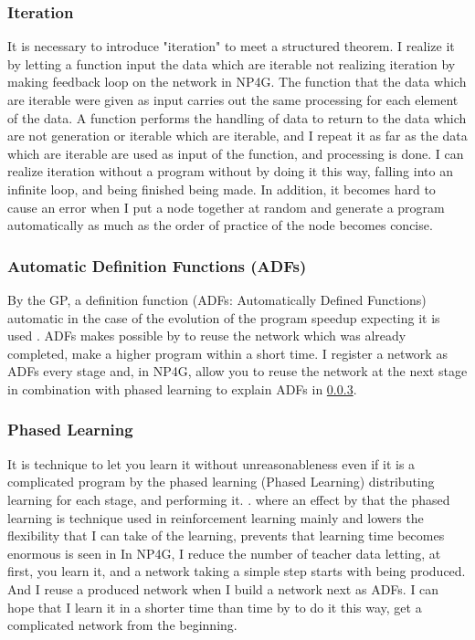 \documentclass{article}
\begin{document}
\subsubsection {Iteration}
It is necessary to introduce "iteration" to meet a structured theorem.
I realize it by letting a function input the data which are iterable not realizing iteration by making feedback loop on the network in NP4G.
The function that the data which are iterable were given as input carries out the same processing for each element of the data.
A function performs the handling of data to return to the data which are not generation or iterable which are iterable, and I repeat it as far as the data which are iterable are used as input of the function, and processing is done.
I can realize iteration without a program without by doing it this way, falling into an infinite loop, and being finished being made.
In addition, it becomes hard to cause an error when I put a node together at random and generate a program automatically as much as the order of practice of the node becomes concise.
\subsubsection {Automatic Definition Functions (ADFs)}
By the GP, a definition function (ADFs: Automatically Defined Functions) automatic in the case of the evolution of the program speedup expecting it is used \cite{adfs}.
ADFs makes possible by to reuse the network which was already completed, make a higher program within a short time.
I register a network as ADFs every stage and, in NP4G, allow you to reuse the network at the next stage in combination with phased learning to explain ADFs in \ref{sec:PL}.
\subsubsection {Phased Learning}
\label{sec:PL}
It is technique to let you learn it without unreasonableness even if it is a complicated program by the phased learning (Phased Learning) distributing learning for each stage, and performing it.
\cite{hodohara2012reinforcement}. where an effect by that the phased learning is technique used in reinforcement learning mainly and lowers the flexibility that I can take of the learning, prevents that learning time becomes enormous is seen in
In NP4G, I reduce the number of teacher data letting, at first, you learn it, and a network taking a simple step starts with being produced.
And I reuse a produced network when I build a network next as ADFs.
I can hope that I learn it in a shorter time than time by to do it this way, get a complicated network from the beginning.
\end{document}
